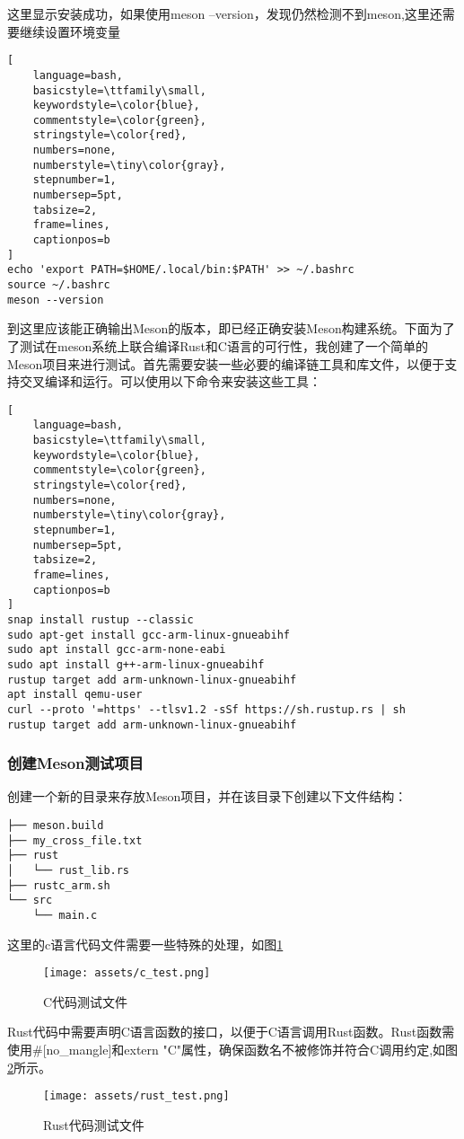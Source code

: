 这里显示安装成功，如果使用meson --version，发现仍然检测不到meson,这里还需要继续设置环境变量
\begin{lstlisting}[
    language=bash,
    basicstyle=\ttfamily\small,
    keywordstyle=\color{blue},
    commentstyle=\color{green},
    stringstyle=\color{red},
    numbers=none,
    numberstyle=\tiny\color{gray},
    stepnumber=1,
    numbersep=5pt,
    tabsize=2,
    frame=lines,
    captionpos=b
]
echo 'export PATH=$HOME/.local/bin:$PATH' >> ~/.bashrc
source ~/.bashrc
meson --version
\end{lstlisting}
到这里应该能正确输出Meson的版本，即已经正确安装Meson构建系统。下面为了了测试在meson系统上联合编译Rust和C语言的可行性，我创建了一个简单的Meson项目来进行测试。首先需要安装一些必要的编译链工具和库文件，以便于支持交叉编译和运行。可以使用以下命令来安装这些工具：

\begin{lstlisting}[
    language=bash,
    basicstyle=\ttfamily\small,
    keywordstyle=\color{blue},
    commentstyle=\color{green},
    stringstyle=\color{red},
    numbers=none,
    numberstyle=\tiny\color{gray},
    stepnumber=1,
    numbersep=5pt,
    tabsize=2,
    frame=lines,
    captionpos=b
]
snap install rustup --classic
sudo apt-get install gcc-arm-linux-gnueabihf
sudo apt install gcc-arm-none-eabi
sudo apt install g++-arm-linux-gnueabihf
rustup target add arm-unknown-linux-gnueabihf
apt install qemu-user
curl --proto '=https' --tlsv1.2 -sSf https://sh.rustup.rs | sh
rustup target add arm-unknown-linux-gnueabihf
\end{lstlisting}

\subsubsection{创建Meson测试项目}
\indent 创建一个新的目录来存放Meson项目，并在该目录下创建以下文件结构：
\begin{verbatim}
├── meson.build
├── my_cross_file.txt
├── rust
│   └── rust_lib.rs
├── rustc_arm.sh
└── src
    └── main.c
\end{verbatim}

这里的c语言代码文件需要一些特殊的处理，如图\ref{c_test}
\begin{figure}[!htpb]
    \centering
    \texttt{[image: assets/c\_test.png]}
    \caption{C代码测试文件}
    \label{c_test}
\end{figure}

Rust代码中需要声明C语言函数的接口，以便于C语言调用Rust函数。Rust函数需使用\#[no\_mangle]和extern "C"属性，确保函数名不被修饰并符合C调用约定,如图\ref{rust_test}所示。
\begin{figure}[!htpb]
    \centering
    \texttt{[image: assets/rust\_test.png]}
    \caption{Rust代码测试文件}
    \label{rust_test}
\end{figure}

